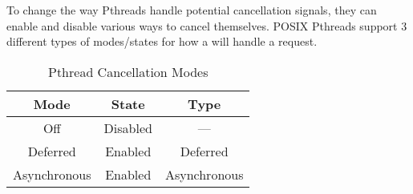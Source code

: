 To change the way Pthreads handle potential cancellation signals, they can enable and disable various ways to cancel themselves.
POSIX Pthreads support 3 different types of modes/states for how a  will handle a request.
\begin{table}[h!tbp]
  \centering
  \begin{tabular}{ccc}
    \toprule
    Mode & State & Type \\
    \midrule
    Off & Disabled & --- \\
    Deferred & Enabled & Deferred \\
    Asynchronous & Enabled & Asynchronous \\
    \bottomrule
  \end{tabular}
  \caption{Pthread Cancellation Modes}
  \label{tab:Pthread_Cancellation_Modes}
\end{table}


